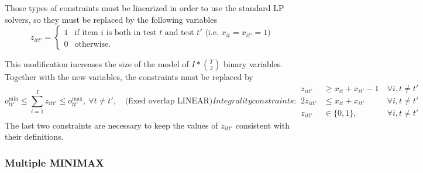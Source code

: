Those types of constraints must be linearized in order to use the standard LP solvers, so they must be replaced by the following variables
\begin{equation*}
z_{itt'}=
\begin{cases}
1 & \mbox{if item }i \mbox{ is both in test }t \mbox{ and test } t' \mbox{ (i.e. }x_{it}=x_{it'}=1 \mbox{)} \\
0 & \mbox{otherwise}.
\end{cases}
\end{equation*}

This modification increases the size of the model of $I*{{T}\choose{2}}$ binary variables.
Together with the new variables, the constraints must be replaced by
\begin{subequations}[resume]
	\begin{equation}
	o^{\min}_{tt'} \le \sum_{i=1}^I{z_{itt'}} \le o^{\max}_{tt'}, \ \forall t \neq t', \quad \mbox{(fixed overlap LINEAR)}
	\end{equation}
	Integrality constraints:
	\begin{alignat}{2}
	\label{eq:Mmod:Mic1}
	z_{iit'} & \ge x_{it}+x_{it'}-1 \ & \forall i,t \neq t'\\
	\label{eq:Mmod:Mic2}
	2 z_{iit'} & \le x_{it}+x_{it'} \ & \forall i,t \neq t'\\
	\nonumber
	z_{itt'} & \in \{0,1\}, \ & \forall i,t \neq t'     
	\end{alignat}
	
\end{subequations}
The last two constraints are necessary to keep the values of $z_{itt'}$ consistent with their definitions.

\subsubsection{Multiple MINIMAX}

